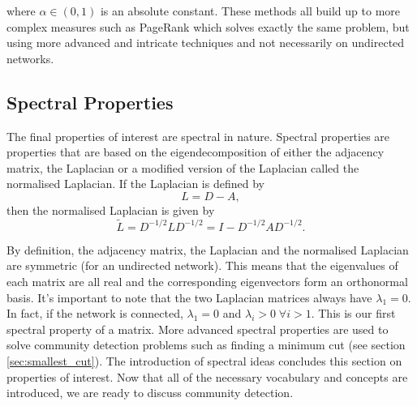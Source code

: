 \noindent
where $\alpha \in (0, 1)$ is an absolute constant. These methods all build up to more complex measures such as PageRank \cite{pagerank} which solves exactly the same problem, but using more advanced and intricate techniques and not necessarily on undirected networks.

\subsection{Spectral Properties}
The final properties of interest are spectral in nature. Spectral properties are properties that are based on the eigendecomposition of either the adjacency matrix, the Laplacian or a modified version of the Laplacian called the normalised Laplacian. If the Laplacian is defined by
$$ L = D - A, $$
\noindent
then the normalised Laplacian is given by 
$$ \tilde L = D^{-1/2}LD^{-1/2} = I - D^{-1/2}AD^{-1/2}. $$

By definition, the adjacency matrix, the Laplacian and the normalised Laplacian are symmetric (for an undirected network). This means that the eigenvalues of each matrix are all real and the corresponding eigenvectors form an orthonormal basis. It's important to note that the two Laplacian matrices always have $\lambda_1 = 0$. In fact, if the network is connected, $\lambda_1 = 0$ and $\lambda_i > 0 \; \forall i > 1$. This is our first spectral property of a matrix. More advanced spectral properties are used to solve community detection problems such as finding a minimum cut (see section \ref{sec:smallest_cut}). The introduction of spectral ideas concludes this section on properties of interest. Now that all of the necessary vocabulary and concepts are introduced, we are ready to discuss community detection.
